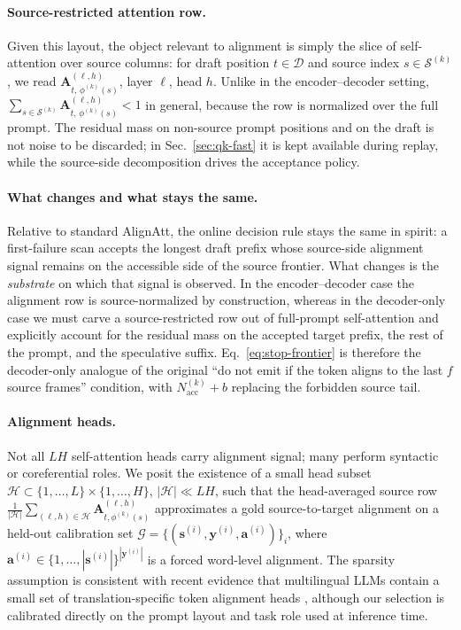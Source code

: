 \documentclass[11pt,twocolumn]{article}
\begin{document}
\paragraph{Source-restricted attention row.}
Given this layout, the object relevant to alignment is simply the slice of
self-attention over source columns: for draft position $t \in \mathcal{D}$ and
source index $s \in \mathcal{S}^{(k)}$, we read
$\mathbf{A}^{(\ell,h)}_{t,\, \phi^{(k)}(s)}$, layer $\ell$, head $h$. Unlike
in the encoder--decoder setting, $\sum_{s \in \mathcal{S}^{(k)}}
\mathbf{A}^{(\ell,h)}_{t,\, \phi^{(k)}(s)} < 1$ in general, because the row is
normalized over the full prompt. The residual mass on non-source prompt
positions and on the draft is not noise to be discarded; in
Sec.~\ref{sec:qk-fast} it is kept available during replay, while the
source-side decomposition drives the acceptance policy.

\paragraph{What changes and what stays the same.}
Relative to standard AlignAtt, the online decision rule stays the same in
spirit: a first-failure scan accepts the longest draft prefix whose
source-side alignment signal remains on the accessible side of the source
frontier. What changes is the \emph{substrate} on which that signal is
observed. In the encoder--decoder case the alignment row is source-normalized
by construction, whereas in the decoder-only case we must carve a
source-restricted row out of full-prompt self-attention and explicitly account
for the residual mass on the accepted target prefix, the rest of the prompt,
and the speculative suffix. Eq.~\eqref{eq:stop-frontier} is therefore the
decoder-only analogue of the original ``do not emit if the token aligns to the
last $f$ source frames'' condition, with $N^{(k)}_{\mathrm{acc}} + b$ replacing
the forbidden source tail.

\paragraph{Alignment heads.}
Not all $LH$ self-attention heads carry alignment signal; many perform
syntactic or coreferential roles. We posit the existence of a small
head subset $\mathcal{H} \subset \{1,\ldots,L\} \times \{1,\ldots,H\}$,
$|\mathcal{H}| \ll LH$, such that the head-averaged source row
$\frac{1}{|\mathcal{H}|} \sum_{(\ell,h) \in \mathcal{H}}
\mathbf{A}^{(\ell,h)}_{t, \phi^{(k)}(s)}$
approximates a gold source-to-target alignment on a held-out calibration set
$\mathcal{G} = \{(\mathbf{s}^{(i)}, \mathbf{y}^{(i)}, \mathbf{a}^{(i)})\}_i$,
where $\mathbf{a}^{(i)} \in \{1,\ldots,|\mathbf{s}^{(i)}|\}^{|\mathbf{y}^{(i)}|}$
is a forced word-level alignment. The sparsity assumption is consistent with
recent evidence that multilingual LLMs contain a small set of
translation-specific token alignment heads \cite{tokenheads26}, although our
selection is calibrated directly on the prompt layout and task role used at
inference time.
\end{document}
